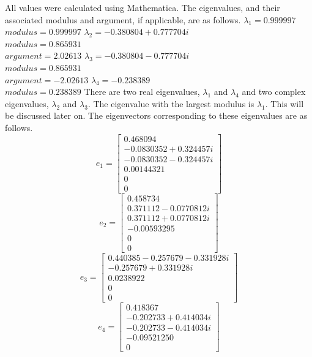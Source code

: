 \documentclass[12pt]{extarticle}
\begin{document}
All values were calculated using Mathematica. The eigenvalues, and their associated modulus and argument, if applicable, are as follows.  
\newline
$\lambda_1 = 0.999997$\\
$modulus = 0.999997$
\newline
\newline
$\lambda_2 = -0.380804 + 0.777704i$\\
$modulus = 0.865931$\\
$argument = 2.02613$
\newline
\newline
$\lambda_3 = -0.380804 - 0.777704i$\\
$modulus = 0.865931$\\
$argument = -2.02613$
\newline
\newline
$\lambda_4 = -0.238389$\\
$modulus = 0.238389$
\newline
There are two real eigenvalues, $\lambda_1$ and $\lambda_4$ and two complex eigenvalues, $\lambda_2$ and $\lambda_3$. The eigenvalue with the largest modulus is $\lambda_1$. This will be discussed later on. 
\newline
The eigenvectors corresponding to these eigenvalues are as follows.
\newline
\[e_1 = \begin{bmatrix}
 0.468094\\
 -0.0830352 + 0.324457i\\
 -0.0830352 - 0.324457i\\
 0.00144321\\
 0\\
 0
\end{bmatrix}\]
\[e_2 = \begin{bmatrix}
 0.458734\\
 0.371112 - 0.0770812i\\
 0.371112 + 0.0770812i\\
 -0.00593295\\
 0\\
 0
\end{bmatrix}\]
\[e_3 = \begin{bmatrix}
 0.440385
 -0.257679 - 0.331928i\\
 -0.257679 + 0.331928i\\
 0.0238922\\
 0\\
 0
\end{bmatrix}\]
\[e_4 = \begin{bmatrix}
 0.418367\\
 -0.202733 + 0.414034i\\
 -0.202733 - 0.414034i\\
 -0.0952125
 0\\
 0
\end{bmatrix}\]
\end{document}
